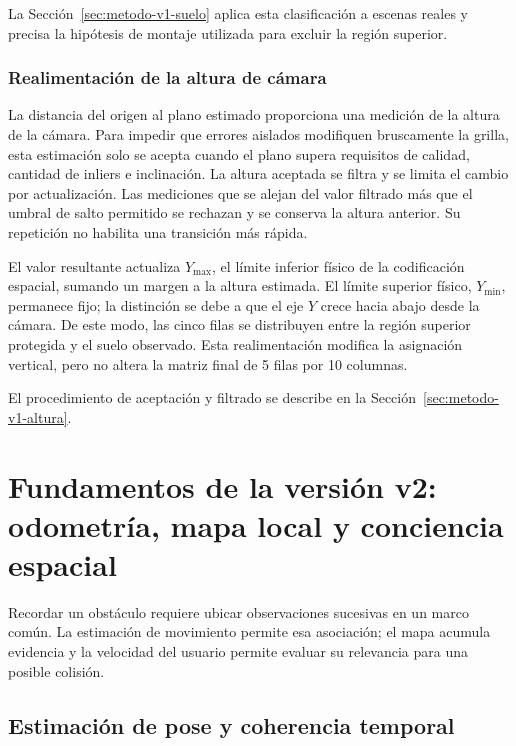 La Sección~\ref{sec:metodo-v1-suelo} aplica esta clasificación a escenas reales y precisa la
hipótesis de montaje utilizada para excluir la región superior.

\subsubsection{Realimentación de la altura de cámara}

La distancia del origen al plano estimado proporciona una medición de la altura de la cámara.
Para impedir que errores aislados modifiquen bruscamente la grilla, esta estimación solo se
acepta cuando el plano supera requisitos de calidad, cantidad de inliers e inclinación. La
altura aceptada se filtra y se limita el cambio por actualización. Las mediciones que se alejan
del valor filtrado más que el umbral de salto permitido se rechazan y se conserva la altura
anterior. Su repetición no habilita una transición más rápida.

El valor resultante actualiza $Y_{\max}$, el límite inferior físico de la codificación espacial,
sumando un margen a la altura estimada. El límite superior físico, $Y_{\min}$, permanece fijo;
la distinción se debe a que el eje $Y$ crece hacia abajo desde la cámara. De este modo, las cinco
filas se distribuyen entre la región superior protegida y el suelo observado. Esta realimentación
modifica la asignación vertical, pero no altera la matriz final de 5 filas por 10 columnas.

El procedimiento de aceptación y filtrado se describe en la Sección~\ref{sec:metodo-v1-altura}.

\section{Fundamentos de la versión v2: odometría, mapa local y conciencia espacial}
\label{sec:mt-v2}

Recordar un obstáculo requiere ubicar observaciones sucesivas en un marco común. La estimación de
movimiento permite esa asociación; el mapa acumula evidencia y la velocidad del usuario permite
evaluar su relevancia para una posible colisión.

\subsection{Estimación de pose y coherencia temporal}
\label{sec:mt-pose-coherencia-temporal}

